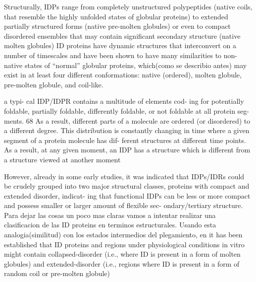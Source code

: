 Structurally, IDPs range from completely unstructured polypeptides (native coils, that resemble the highly unfolded states of globular proteins) to extended partially structured forms (native pre-molten globules) or even to compact disordered ensembles that may contain significant secondary structure (native molten globules)
ID proteins have dynamic structures that interconvert on a number of timescales and have been shown to have many similarities to non-native states of “normal” globular proteins, which(como se describio antes) may exist in at least four different conformations: native (ordered), molten globule, pre-molten globule, and coil-like.

a typi-
cal IDP/IDPR contains a multitude of elements cod-
ing for potentially foldable, partially foldable,
differently foldable, or not foldable at all protein seg-
ments. 68 As a result, different parts of a molecule
are ordered (or disordered) to a different degree.
This distribution is constantly changing in time
where a given segment of a protein molecule has dif-
ferent structures at different time points. As a
result, at any given moment, an IDP has a structure
which is different from a structure viewed at
another moment

However, already in some early studies, it was indicated that IDPs/IDRs could be crudely grouped into two major structural classes, proteins with compact and extended disorder, indicat-
ing that functional IDPs can be less or more compact
and possess smaller or larger amount of flexible sec-
ondary/tertiary structure.
Para dejar las cosas un poco mas claras vamos a intentar realizar una clasificacion de las ID proteins en terminos estructurales.
Usando esta analogia(similitud) con los estados intermedios del plegamiento, en \cite{uversky2010understanding} it has been established that ID proteins and regions under physiological conditions in vitro might 
contain collapsed-disorder (i.e., where ID is present in a form of molten globules) and extended-disorder (i.e., regions where ID is present in a form of random coil or pre-molten globule)

